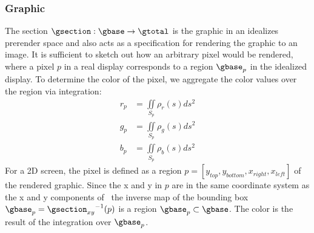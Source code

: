 \documentclass[../main.tex]{subfiles}
\begin{document}
\subsubsection{Graphic \gsection}
\label{sec:graphic_section}
The section $\gsection: \gbase \rightarrow \gtotal$ is the graphic in an idealizes prerender space and also acts as a specification for rendering the graphic to an image. It is sufficient to sketch out how an arbitrary pixel would be rendered, where a pixel $p$ in a real display corresponds to a region $\gbase_p$ in the idealized display. To determine the color of the pixel, we aggregate the color values over the region via integration:
\begin{align*}
    \label{eq:math:graphic:section:color}
    r_p &= \iint\limits_{S_p} \rho_r(s)ds^{2}\\
    g_p &= \iint\limits_{S_p} \rho_g(s)ds^{2}\\
    b_p &= \iint\limits_{S_p} \rho_b(s)ds^{2}
\end{align*}
For a 2D screen, the pixel is defined as a region $p=\left[y_{top}, y_{bottom}, x_{right}, x_{left}\right]$ of the rendered graphic. Since the x and y in $p$ are in the same coordinate system as the x and y components of \gfiber\,  the inverse map of the bounding box $\gbase_{p} ={\gsection_{xy}}^{-1}(p)$ is a region $\gbase_p \subset \gbase$. The color is the result of the integration over  $\gbase_p$.
\end{document}
